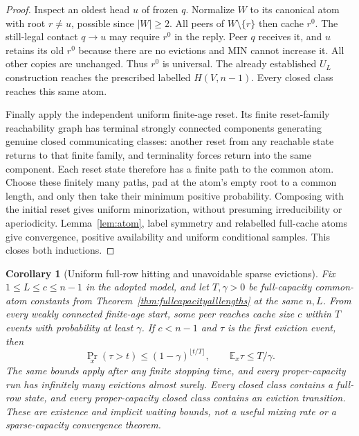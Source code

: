 \documentclass[11pt]{article}
\newtheorem{corollary}[theorem]{Corollary}
\begin{document}
\begin{proof}
Inspect an oldest head $u$ of frozen $q$. Normalize $W$ to its
canonical atom with root $r\ne u$, possible since $|W|\ge2$.
All peers of $W\setminus\{r\}$ then cache $r^0$.
The still-legal contact $q\to u$ may require $r^0$ in the reply.
Peer $q$ receives it, and $u$ retains its old $r^0$ because there
are no evictions and MIN cannot increase it. All other copies
are unchanged. Thus $r^0$ is universal. The already established
$U_L$ construction reaches the prescribed labelled $H(V,n-1)$.
Every closed class reaches this same atom.

Finally apply the independent uniform finite-age reset.
Its finite reset-family reachability graph has terminal strongly
connected components generating genuine closed communicating
classes: another reset from any reachable state returns to that
finite family, and terminality forces return into the same
component. Each reset state therefore has a finite path to the
common atom. Choose these finitely many paths, pad at the atom's
empty root to a common length, and only then take their minimum
positive probability. Composing with the initial reset gives
uniform minorization, without presuming irreducibility or
aperiodicity. Lemma~\ref{lem:atom}, label symmetry and relabelled
full-cache atoms give convergence, positive availability and
uniform conditional samples. This closes both inductions.
\end{proof}

\begin{corollary}[Uniform full-row hitting and unavoidable sparse evictions]
\label{cor:alllengthoverflow}
Fix $1\le L\le c\le n-1$ in the adopted model, and let
$T,\gamma>0$ be full-capacity common-atom constants from
Theorem~\ref{thm:fullcapacityalllengths} at the same $n,L$.
From every weakly connected finite-age start, some peer reaches
cache size $c$ within $T$ events with probability at least $\gamma$.
If $c<n-1$ and $\tau$ is the first eviction event, then
\[
 \Pr_x(\tau>t)\le(1-\gamma)^{\lfloor t/T\rfloor},
 \qquad \mathbb E_x\tau\le T/\gamma.
\]
The same bounds apply after any finite stopping time, and every
proper-capacity run has infinitely many evictions almost surely.
Every closed class contains a full-row state, and every
proper-capacity closed class contains an eviction transition.
These are existence and implicit waiting bounds, not a useful
mixing rate or a sparse-capacity convergence theorem.
\end{corollary}
\end{document}
